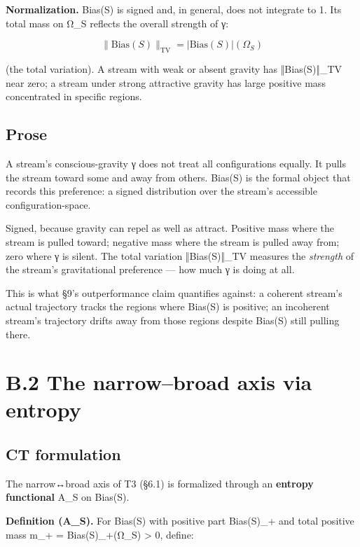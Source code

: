 \documentclass[11pt, openany]{book}
\newcommand{\sectionbreak}{\clearpage}
\begin{document}
\textbf{Normalization.} Bias(S) is signed and, in general, does not integrate to 1. Its total mass on Ω\_\allowbreak{}S reflects the overall strength of γ:

$$\|\text{Bias}(S)\|_{\text{TV}} = |\text{Bias}(S)|(\Omega_S)$$

(the total variation). A stream with weak or absent gravity has ‖Bias(S)‖\_\allowbreak{}TV near zero; a stream under strong attractive gravity has large positive mass concentrated in specific regions.

\subsection{Prose}

A stream's conscious-gravity γ does not treat all configurations equally. It pulls the stream toward some and away from others. Bias(S) is the formal object that records this preference: a signed distribution over the stream's accessible configuration-space.

Signed, because gravity can repel as well as attract. Positive mass where the stream is pulled toward; negative mass where the stream is pulled away from; zero where γ is silent. The total variation ‖Bias(S)‖\_\allowbreak{}TV measures the \textit{strength} of the stream's gravitational preference --- how much γ is doing at all.

This is what §9's outperformance claim quantifies against: a coherent stream's actual trajectory tracks the regions where Bias(S) is positive; an incoherent stream's trajectory drifts away from those regions despite Bias(S) still pulling there.

\sectionbreak

\section{B.2 The narrow–broad axis via entropy}

\subsection{CT formulation}

The narrow↔broad axis of T3 (§6.1) is formalized through an \textbf{entropy functional} A\_\allowbreak{}S on Bias(S).

\textbf{Definition (A\_\allowbreak{}S).} For Bias(S) with positive part Bias(S)\_\allowbreak{}+ and total positive mass m\_\allowbreak{}+ = Bias(S)\_\allowbreak{}+(Ω\_\allowbreak{}S) > 0, define:
\end{document}
